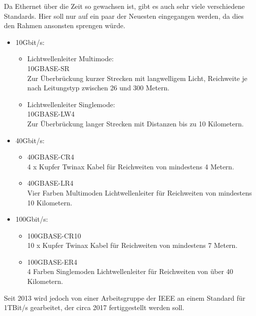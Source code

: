 \documentclass[12pt,a4paper]{report}
\begin{document}
\begin{onehalfspace}
Da Ethernet über die Zeit so gewachsen ist, gibt es auch sehr viele verschiedene Standards. Hier soll nur auf ein paar der Neuesten eingegangen werden, da dies den Rahmen ansonsten sprengen würde.\\
\begin{itemize}
\item 10Gbit/s:
\begin{itemize}
\item Lichtwellenleiter Multimode:\\
10GBASE-SR\\
Zur Überbrückung kurzer Strecken mit langwelligem Licht, Reichweite je nach Leitungstyp zwischen 26 und 300 Metern.
\item Lichtwellenleiter Singlemode:\\
10GBASE-LW4\\
Zur Überbrückung langer Strecken mit Distanzen bis zu 10 Kilometern.
\end{itemize}
\item 40Gbit/s:
\begin{itemize}
\item 40GBASE-CR4\\
4 x Kupfer Twinax Kabel für Reichweiten von mindestens 4 Metern.
\item 40GBASE-LR4\\
Vier Farben Multimoden Lichtwellenleiter für Reichweiten von mindestens 10 Kilometern.
\end{itemize}
\item 100Gbit/s:
\begin{itemize}
\item 100GBASE-CR10\\
10 x Kupfer Twinax Kabel für Reichweiten von mindestens 7 Metern.
\item 100GBASE-ER4\\
4 Farben Singlemoden Lichtwellenleiter für Reichweiten von über 40 Kilometern.
\end{itemize}
\end{itemize}
Seit 2013 wird jedoch von einer Arbeitsgruppe der IEEE an einem Standard für 1TBit/s gearbeitet, der circa 2017 fertiggestellt werden soll.\\


\end{onehalfspace}
\end{document}
